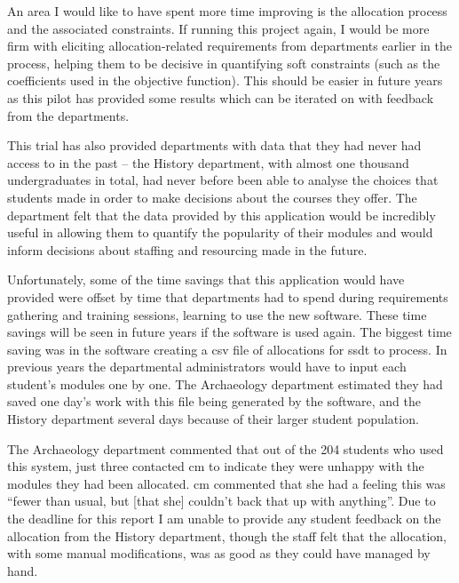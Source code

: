 An area I would like to have spent more time improving is the allocation
process and the associated constraints. If running this project again, I would
be more firm with eliciting allocation-related requirements from departments
earlier in the process, helping them to be decisive in quantifying soft
constraints (such as the coefficients used in the objective function). This
should be easier in future years as this pilot has provided some results which
can be iterated on with feedback from the departments.

This trial has also provided departments with data that they had never had
access to in the past -- the History department, with almost one thousand
undergraduates in total, had never before been able to analyse the choices
that students made in order to make decisions about the courses they offer.
The department felt that the data provided by this application would be
incredibly useful in allowing them to quantify the popularity of their modules
and would inform decisions about staffing and resourcing made in the future.

Unfortunately, some of the time savings that this application would have
provided were offset by time that departments had to spend during requirements
gathering and training sessions, learning to use the new software. These time
savings will be seen in future years if the software is used again. The
biggest time saving was in the software creating a \gls{csv} file of
allocations for \gls{ssdt} to process. In previous years the departmental
administrators would have to input each student's modules one by one. The
Archaeology department estimated they had saved one day's work with this file
being generated by the software, and the History department several days
because of their larger student population.

The Archaeology department commented that out of the 204 students who used
this system, just three contacted \gls{cm} to indicate they were unhappy with
the modules they had been allocated. \gls{cm} commented that she had a feeling
this was ``fewer than usual, but [that she] couldn’t back that up with
anything''. Due to the deadline for this report I am unable to provide any
student feedback on the allocation from the History department, though the
staff felt that the allocation, with some manual modifications, was as good as
they could have managed by hand.
